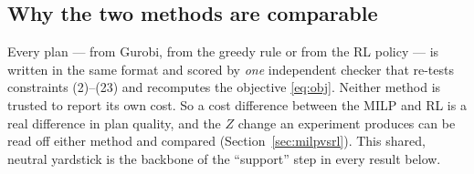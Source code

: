 \subsection{Why the two methods are comparable}
Every plan --- from Gurobi, from the greedy rule or from the RL policy --- is written in the same format and scored
by \emph{one} independent checker that re-tests constraints (2)--(23) and recomputes the objective \eqref{eq:obj}.
Neither method is trusted to report its own cost. So a cost difference between the MILP and RL is a real difference
in plan quality, and the $Z$ change an experiment produces can be read off either method and compared
(Section~\ref{sec:milpvsrl}). This shared, neutral yardstick is the backbone of the ``support'' step in every
result below.

